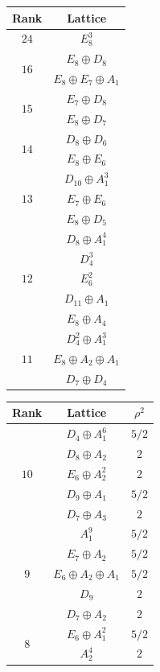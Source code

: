 \documentclass[11pt,letterpaper]{amsart}
\begin{document}
\begin{table}[H]
\centering
\begin{tabular}{ c | c } 
  Rank & Lattice\\
  \hline
  \hline
\multirow{1}{1.5em}{$24$}
&$E_8^3$\\
\hline
\multirow{2}{1.5em}{$16$} 
&$E_8\oplus D_8$ \\
&$E_8\oplus E_7\oplus A_1$ \\
  \hline
\multirow{2}{1.5em}{$15$} &$E_7\oplus D_8$ \\
&$E_8\oplus D_7$ \\
  \hline
\multirow{2}{1.5em}{$14$} &$D_8\oplus D_6$ \\
&$E_8\oplus E_6$ \\
  \hline
  \multirow{3}{1.5em}{$13$} &$D_{10}\oplus A_1^3$ \\
&$E_7\oplus E_6$ \\
&$E_8\oplus D_5$ \\
  \hline
\multirow{5}{1.5em}{$12$}
&$D_8\oplus A_1^4$ \\
&$D_4^3$ \\
&$E_6^2$ \\
&$D_{11}\oplus A_1$ \\
&$E_8\oplus A_4$ \\
  \hline
\multirow{3}{1.5em}{$11$}
&$D_4^2\oplus A_1^3$ \\
&$E_8\oplus A_2\oplus A_1$ \\
&$D_7\oplus D_4$ \\
\end{tabular}
\quad
\begin{tabular}{ c | c | c } 
  Rank & Lattice &$\rho^2$\\
  \hline
  \hline
\multirow{5}{1.5em}{$10$}
&$D_4\oplus A_1^6$ &$5/2$\\
&$D_8\oplus A_2$ &$2$\\
&$E_6\oplus A_2^2$ &$2$\\
&$D_9\oplus A_1$ &$5/2$\\
&$D_7\oplus A_3$ &$2$\\
  \hline
\multirow{5}{1.5em}{$9$} &$A_1^{9}$ &$5/2$\\
&$E_7\oplus A_2$ &$5/2$\\
&$E_6\oplus A_2\oplus A_1$ &$5/2$\\
&$D_9$ &$2$\\
&$D_7\oplus A_2$ &$2$\\
  \hline
\multirow{7}{1.5em}{$8$} 
&$E_6\oplus A_1^2$ &$5/2$\\
&$A_2^4$ &$2$\\

\end{tabular}
\end{table}
\end{document}
